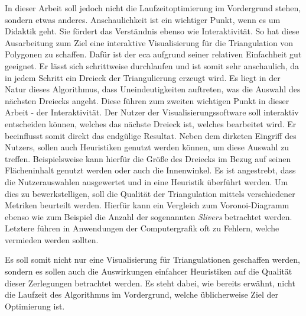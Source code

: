 In dieser Arbeit soll jedoch nicht die Laufzeitoptimierung im Vordergrund stehen, sondern etwas anderes. Anschaulichkeit ist ein wichtiger Punkt, wenn es um Didaktik geht.
Sie fördert das Verständnis ebenso wie Interaktivität. So hat diese Ausarbeitung zum Ziel eine interaktive Visualisierung für die Triangulation von Polygonen zu schaffen.
Dafür ist der \ac{eca} aufgrund seiner relativen Einfachheit gut geeignet. Er lässt sich schrittweise durchlaufen und ist somit sehr anschaulich, da in jedem Schritt ein 
Dreieck der Triangulierung erzeugt wird. Es liegt in der Natur dieses Algorithmus, dass Uneindeutigkeiten auftreten, was die Auswahl des nächsten Dreiecks angeht. Diese 
führen zum zweiten wichtigen Punkt in dieser Arbeit - der Interaktivität. Der Nutzer der Visualisierungssoftware soll interaktiv entscheiden können, welches das nächste 
Dreieck ist, welches bearbeitet wird. Er beeinflusst somit direkt das endgülige Resultat. Neben dem dirketen Eingriff des Nutzers, sollen auch Heuristiken genutzt werden 
können, um diese Auswahl zu treffen. Beispielsweise kann hierfür die Größe des Dreiecks im Bezug auf seinen Flächeninhalt genutzt werden oder auch die Innenwinkel. 
Es ist angestrebt, dass die Nutzerauswahlen ausgewertet und in eine Heuristik überführt werden. Um dies zu bewerkstelligen, soll die Qualität der Triangulation mittels verschiedener 
Metriken beurteilt werden. Hierfür kann ein Vergleich zum Voronoi-Diagramm ebenso wie zum Beispiel die Anzahl der sogenannten \emph{Slivers}\cite{sliver} betrachtet werden. 
Letztere führen in Anwendungen der Computergrafik oft zu Fehlern, welche vermieden werden sollten.

Es soll somit nicht nur eine Visualisierung für Triangulationen geschaffen werden, sondern es sollen auch die Auswirkungen einfahcer Heuristiken auf die Qualität 
dieser Zerlegungen betrachtet werden. Es steht dabei, wie bereits erwähnt, nicht die Laufzeit des Algorithmus im Vordergrund, welche üblicherweise Ziel der Optimierung ist.

